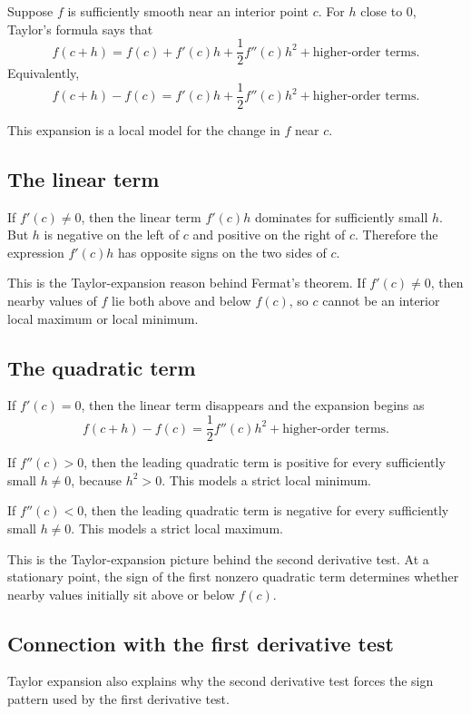 \documentclass{essay}
\begin{document}
Suppose \(f\) is sufficiently smooth near an interior point \(c\). For \(h\) close to \(0\), Taylor's formula says that
\[ f(c+h) = f(c) + f'(c)h + \frac{1}{2} f''(c)h^{2} + \text{higher-order terms}. \]
Equivalently,
\[ f(c+h)-f(c) = f'(c)h + \frac{1}{2} f''(c)h^{2} + \text{higher-order terms}. \]

This expansion is a local model for the change in \(f\) near \(c\).

\subsection{The linear term}

If \(f'(c)\neq0\), then the linear term \(f'(c)h\) dominates for sufficiently small \(h\). But \(h\) is negative on the left of \(c\) and positive on the right of \(c\). Therefore the expression \(f'(c)h\) has opposite signs on the two sides of \(c\).

This is the Taylor-expansion reason behind Fermat's theorem. If \(f'(c)\neq0\), then nearby values of \(f\) lie both above and below \(f(c)\), so \(c\) cannot be an interior local maximum or local minimum.

\subsection{The quadratic term}

If \(f'(c)=0\), then the linear term disappears and the expansion begins as
\[ f(c+h)-f(c) = \frac{1}{2} f''(c)h^{2} + \text{higher-order terms}. \]

If \(f''(c)>0\), then the leading quadratic term is positive for every sufficiently small \(h\neq0\), because \(h^{2}>0\).
This models a strict local minimum.

If \(f''(c)<0\), then the leading quadratic term is negative for every sufficiently small \(h\neq0\). This models a strict local maximum.

This is the Taylor-expansion picture behind the second derivative test. At a stationary point, the sign of the first nonzero quadratic term determines whether nearby values initially sit above or below \(f(c)\).

\subsection{Connection with the first derivative test}

Taylor expansion also explains why the second derivative test forces the sign pattern used by the first derivative test.
\end{document}
